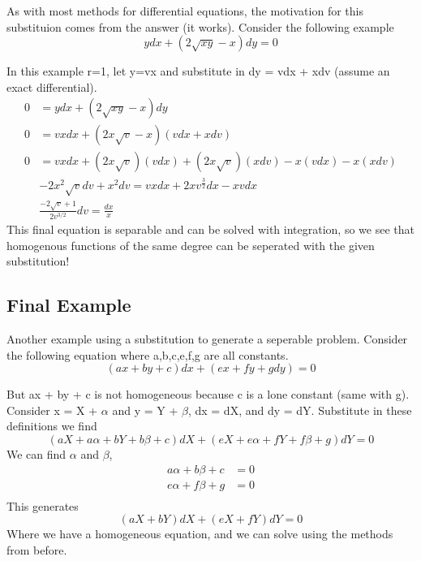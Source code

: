 \documentclass{article}
\newcommand{\be}{\begin{equation}}
\newcommand{\ee}{\end{equation}}
\begin{document}
As with most methods for differential equations, the motivation for this substituion comes from the answer (it works).
Consider the following example
\be
ydx + (2\sqrt{xy} - x) dy = 0
\ee

In this example r=1, let y=vx and substitute in dy = vdx + xdv (assume an exact differential).
\be
\begin{split}
    0 &= ydx + (2\sqrt{xy} - x) dy\\
    0 &= vxdx + (2x\sqrt{v} - x) (vdx + xdv)\\
    0 &= vxdx + (2x\sqrt{v})(vdx) + (2x\sqrt{v})(xdv) - x(vdx) - x(xdv)\\
    &-2x^2\sqrt{v}dv + x^2dv = vxdx + 2xv^{\frac{3}{2}}dx - xvdx \\
    & \frac{-2\sqrt{v}+1}{2v^{3/2}}dv = \frac{dx}{x}
\end{split}
\ee
This final equation is separable and can be solved with integration, so we see that homogenous functions of the same degree can be seperated with the given substitution!

\subsection*{Final Example}
Another example using a substitution to generate a seperable problem. 
Consider the following equation where a,b,c,e,f,g are all constants.
\be
(ax + by + c) dx + (ex + fy + g dy) = 0
\ee

But ax + by + c is not homogeneous because c is a lone constant (same with g).
Consider x = X + $\alpha$ and y = Y + $\beta$, dx = dX, and dy = dY.
Substitute in these definitions we find
\be
(aX + a\alpha + bY + b\beta + c) dX + (eX + e\alpha + fY + f\beta + g) dY = 0
\ee
We can find $\alpha$ and $\beta$,
\be
\begin{split}
    a\alpha + b\beta + c &= 0 \\
    e\alpha + f\beta + g &= 0 \\
\end{split}
\ee
This generates
\be
(aX + bY)dX + (eX + fY)dY = 0
\ee
Where we have a homogeneous equation, and we can solve using the methods from before.
\end{document}
